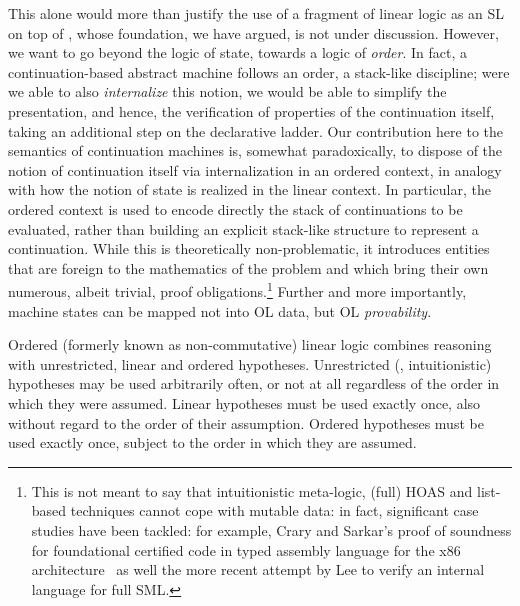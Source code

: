 \documentclass[final]{svjour3}
\begin{document}
This alone would more than justify the use of a fragment of linear
logic as an SL on top of \hybrid, whose foundation, we have argued, is
not under discussion. 
However, we want to go beyond the logic of
state, towards a logic  of \emph{order}.
In fact, a continuation-based abstract machine follows an order, \viz
a stack-like discipline; were we able to also \emph{internalize} this
notion, we would be able to simplify the presentation, and hence, the
verification of properties of the continuation itself, taking an
additional step on the declarative ladder.  Our contribution here to
the semantics of continuation machines is, somewhat paradoxically, to
dispose of the notion of continuation itself via internalization in an
ordered context, in analogy with how the notion of state is realized
in the linear context.  In particular, the ordered context is used to
encode directly the stack of continuations to be evaluated, rather
than building an explicit stack-like structure to represent a
continuation.  While this is theoretically non-problematic, it
introduces entities that are foreign to the mathematics of the problem
and which bring their own numerous, albeit trivial, proof
obligations.\footnote{This is not meant to say that intuitionistic
  meta-logic, (full) HOAS and list-based techniques cannot cope with
  mutable data: in fact, significant case studies have been tackled: for
  example, Crary and Sarkar's proof of soundness for foundational
  certified code in typed assembly language for the x86
  architecture~\cite{CraryS03} as well the more recent attempt by Lee
  \etal \cite{lee+:towards} to verify an internal language for full SML.  }
 Further and more importantly, machine states can be  mapped not into OL
data, but OL \emph{provability}.



Ordered (formerly known as non-commutative) linear logic
\cite{Polakow99mfps} combines reasoning with unrestricted, linear and
ordered hypotheses.  Unrestricted (\ie, intuitionistic) hypotheses may
be used arbitrarily often, or not at all regardless of the order in
which they were assumed.  Linear hypotheses must be used exactly once,
also without regard to the order of their assumption.  Ordered
hypotheses must be used exactly once, subject to the order in which
they are assumed.
\end{document}
